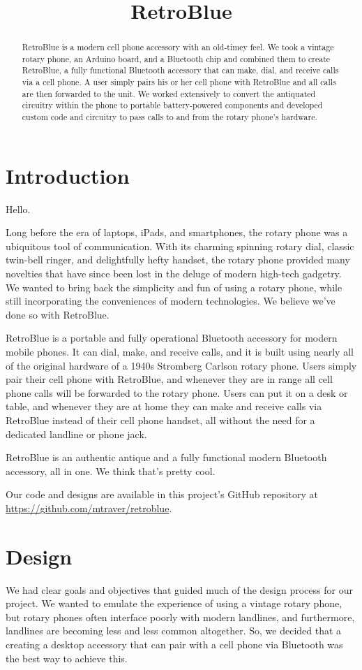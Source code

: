 \documentclass{es50report}
\title{RetroBlue}
\begin{document}
    \maketitlepage

    \begin{abstract}
        RetroBlue is a modern cell phone accessory with an old-timey feel. We took a vintage rotary phone, an Arduino board, and a Bluetooth chip and combined them to create RetroBlue, a fully functional Bluetooth accessory that can make, dial, and receive calls via a cell phone. A user simply pairs his or her cell phone with RetroBlue and all calls are then forwarded to the unit. We worked extensively to convert the antiquated circuitry within the phone to portable battery-powered components and developed custom code and circuitry to pass calls to and from the rotary phone's hardware.
    \end{abstract}
    \newpage

    \section{Introduction}
    Hello. 
    
    Long before the era of laptops, iPads, and smartphones, the rotary phone was a ubiquitous tool of communication. With its charming spinning rotary dial, classic twin-bell ringer, and delightfully hefty handset,  the rotary phone provided many novelties that have since been lost in the deluge of modern high-tech gadgetry. We wanted to bring back the simplicity and fun of using a rotary phone, while still incorporating the conveniences of modern technologies. We believe we've done so with RetroBlue.
    
    RetroBlue is a portable and fully operational Bluetooth accessory for modern mobile phones. It can dial, make, and receive calls, and it is built using nearly all of the original hardware of a 1940s Stromberg Carlson rotary phone. Users simply pair their cell phone with RetroBlue, and whenever they are in range all cell phone calls will be forwarded to the rotary phone. Users can put it on a desk or table, and whenever they are at home they can make and receive calls via RetroBlue instead of their cell phone handset, all without the need for a dedicated landline or phone jack. 
    
    RetroBlue is an authentic antique and a fully functional modern Bluetooth accessory, all in one. We think that's pretty cool.

    Our code and designs are available in this project's GitHub repository at \url{https://github.com/mtraver/retroblue}.

    \section{Design}
        We had clear goals and objectives that guided much of the design process for our project. We wanted to emulate the experience of using a vintage rotary phone, but rotary phones often interface poorly with modern landlines, and furthermore, landlines are becoming less and less common altogether. So, we decided that a creating a desktop accessory that can pair with a cell phone via Bluetooth was the best way to achieve this.
        
\end{document}
